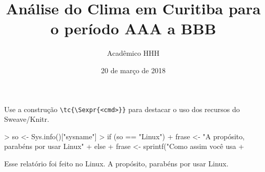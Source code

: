 \documentclass[a4paper]{article}
\title{Análise do Clima em Curitiba para o período AAA a BBB}
\author{Acadêmico HHH}
\date{20 de março de 2018}
\newcommand{\tc}[1]{\textcolor{utahcrimson}{#1}}
\begin{document}


\maketitle

Use a construção \verb|\tc{|\verb|\|\verb|Sexpr{<cmd>}}| para destacar o uso dos
recursos do Sweave/Knitr.

\begin{Schunk}
\begin{Sinput}
> so <- Sys.info()["sysname"]
> if (so == "Linux") {
+     frase <- "A propósito, parabéns por usar Linux"
+ } else {
+     frase <- sprintf("Como assim você usa %s? Use Linux", so)
+ }
\end{Sinput}
\end{Schunk}

Esse relatório foi feito no \tc{Linux}. \tc{A propósito, parabéns por usar Linux}.
\end{document}
